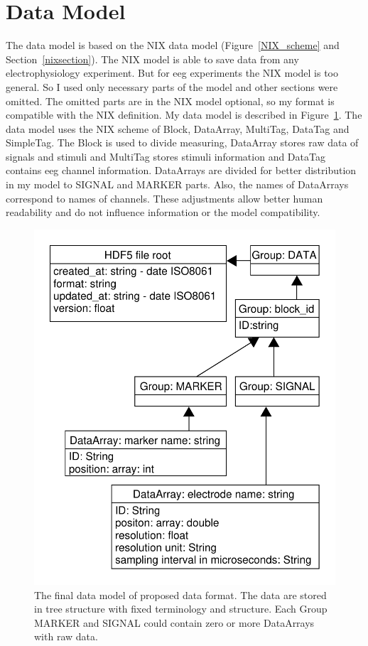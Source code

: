 \section{Data Model}
\label{section_data}
The data model is based on the NIX data model (Figure~\ref{NIX_scheme} and Section~\ref{nixsection}). The NIX model is able to save data from any electrophysiology experiment. But for \gls{eeg} experiments the NIX model is too general. So I used only necessary parts of the model and other sections were omitted. The omitted parts are in the NIX model optional, so my format is compatible with the NIX definition. My data model is described in Figure~\ref{format_scheme}. The data model uses the NIX scheme of Block, DataArray, MultiTag, DataTag and SimpleTag. The Block is used to divide measuring, DataArray stores raw data of signals and stimuli and MultiTag stores stimuli information and DataTag contains \gls{eeg} channel information. DataArrays are divided for better distribution in my model to SIGNAL and MARKER parts. Also, the names of DataArrays correspond to names of channels. These adjustments allow better human readability and do not influence information or the model compatibility.

\begin{figure}
	\begin{center}
		\includegraphics[scale=0.51]{obrazky/data.pdf}
		\caption{The final data model of proposed data format. The data are stored in tree structure with fixed terminology and structure. Each Group MARKER and SIGNAL could contain zero or more DataArrays with raw data.}
		\label{format_scheme}
	\end{center}
\end{figure}



